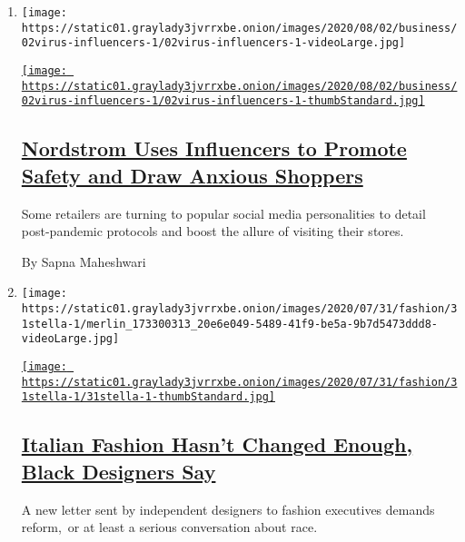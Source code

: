 \begin{enumerate}
\def\labelenumi{\arabic{enumi}.}
\item
  \texttt{[image: https://static01.graylady3jvrrxbe.onion/images/2020/08/02/business/02virus-influencers-1/02virus-influencers-1-videoLarge.jpg]}

  \href{/2020/08/02/business/media/coronavirus-nordstrom-infuencers.html}{\texttt{[image: https://static01.graylady3jvrrxbe.onion/images/2020/08/02/business/02virus-influencers-1/02virus-influencers-1-thumbStandard.jpg]}}

  \hypertarget{nordstrom-uses-influencers-to-promote-safety-and-draw-anxious-shoppers}{%
  \subsection{\texorpdfstring{\href{/2020/08/02/business/media/coronavirus-nordstrom-infuencers.html}{Nordstrom
  Uses Influencers to Promote Safety and Draw Anxious
  Shoppers}}{Nordstrom Uses Influencers to Promote Safety and Draw Anxious Shoppers}}\label{nordstrom-uses-influencers-to-promote-safety-and-draw-anxious-shoppers}}

  Some retailers are turning to popular social media personalities to
  detail post-pandemic protocols and boost the allure of visiting their
  stores.

  By Sapna Maheshwari
\item
  \texttt{[image: https://static01.graylady3jvrrxbe.onion/images/2020/07/31/fashion/31stella-1/merlin\_173300313\_20e6e049-5489-41f9-be5a-9b7d5473ddd8-videoLarge.jpg]}

  \href{/2020/07/31/fashion/italian-fashion-black-designers.html}{\texttt{[image: https://static01.graylady3jvrrxbe.onion/images/2020/07/31/fashion/31stella-1/31stella-1-thumbStandard.jpg]}}

  \hypertarget{italian-fashion-hasnt-changed-enough-black-designers-say}{%
  \subsection{\texorpdfstring{\href{/2020/07/31/fashion/italian-fashion-black-designers.html}{Italian
  Fashion Hasn't Changed Enough, Black Designers
  Say}}{Italian Fashion Hasn't Changed Enough, Black Designers Say}}\label{italian-fashion-hasnt-changed-enough-black-designers-say}}

  A new letter sent by independent designers to fashion executives
  demands reform,~or at least a serious conversation about race.


\end{enumerate}
